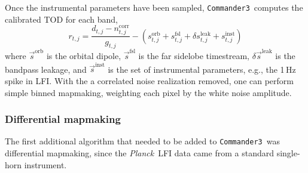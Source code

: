 \documentclass[twocolumn]{../../common/aa}
\def\Planck{\emph{Planck}}
\def\commanderthree{\texttt{Commander3}}
\newcommand{\s}[0]{\vec{s}}
\begin{document}
Once the instrumental parameters have been sampled, \commanderthree\ computes the calibrated TOD for each band,
\begin{equation}
	r_{t,j}=\frac{d_{t,j}-n_{t,j}^\mathrm{corr}}{g_{t,j}}-\left(s_{t,j}^\mathrm{orb}
	+s_{t,j}^\mathrm{fsl}+\delta s_{t,j}^\mathrm{leak}+s_{t,j}^\mathrm{inst}\right)
\end{equation}
where $\s^\mathrm{orb}$ is the orbital dipole, $\s^\mathrm{fsl}$ is the far sidelobe timestream, $\delta\s^\mathrm{leak}$ is the bandpass leakage, and $\s^\mathrm{inst}$ is the set of instrumental parameters, e.g., the 1\,Hz spike in LFI. With the a correlated noise realization removed, one can perform simple binned mapmaking, weighting each pixel by the white noise amplitude.





\subsubsection{Differential mapmaking}
\label{ssec:mapmaking}

The first additional algorithm that needed to be added to \commanderthree\ was differential mapmaking, since the \Planck\ LFI data came from a standard single-horn instrument.  
\end{document}

